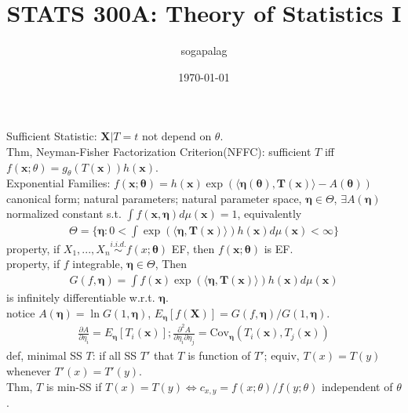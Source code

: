 \documentclass[paper=a4, fontsize=11pt]{scrartcl} %
\title{STATS 300A: Theory of Statistics I}
\author{sogapalag}
\date{\normalsize\today}
\numberwithin{equation}{section} %
\numberwithin{figure}{section} %
\numberwithin{table}{section} %
\def \cov {\text{Cov}}
\begin{document}
\maketitle
Sufficient Statistic: $\mathbf{X}|T=t$ not depend on $\theta$.\\
Thm, Neyman-Fisher Factorization Criterion(NFFC): sufficient $T$ iff $f(\mathbf{x};\theta) = g_\theta(T(\mathbf{x})) h(\mathbf{x})$.\\
Exponential Families: $f(\mathbf{x};\bm{\theta})=h(\mathbf{x})\exp(\langle\bm{\eta}(\bm{\theta}),\mathbf{T}(\mathbf{x})\rangle - A(\bm{\theta}))$\\
canonical form; natural parameters; natural parameter space, $\bm{\eta}\in \Theta$, $\exists A(\bm{\eta})$ normalized constant s.t. $\int f(\mathbf{x},\bm{\eta})d\mu(\mathbf{x})=1$, equivalently
\begin{align}
	\Theta = \{\bm{\eta}: 0<\int \exp(\langle \bm{\eta}, \mathbf{T}(\mathbf{x})\rangle)h(\mathbf{x})d\mu(\mathbf{x}) <\infty\}
\end{align}
property, if $X_1,...,X_n \stackrel{i.i.d.}{\sim} f(x;\bm{\theta})$ EF, then $f(\mathbf{x};\bm{\theta})$ is EF.\\
property, if $f$ integrable, $\bm{\eta}\in\Theta$, Then
\begin{align}
	G(f,\bm{\eta}) = \int f(\mathbf{x}) \exp(\langle \bm{\eta}, \mathbf{T}(\mathbf{x})\rangle)h(\mathbf{x})d\mu(\mathbf{x})
\end{align}
is infinitely differentiable w.r.t. $\bm{\eta}$.\\
notice $ A(\bm{\eta})=\ln G(1,\bm{\eta})$, $E_{\bm{\eta}}[f(\mathbf{X})] = G(f,\bm{\eta})/G(1,\bm{\eta})$.
\begin{align}
	\frac{\partial A}{\partial \eta_i} = E_{\bm{\eta}}[T_i(\mathbf{x})]; \frac{\partial^2 A}{\partial \eta_i \partial \eta_j} = \cov_{\bm{\eta}}(T_i(\mathbf{x}),T_j(\mathbf{x}))
\end{align}
def, minimal SS $T$: if all SS $T'$ that $T$ is  function of $T'$; equiv, $T(x)=T(y)$ whenever $T'(x)=T'(y)$.\\
Thm, $T$ is min-SS if $T(x)=T(y) \Leftrightarrow c_{x,y} = f(x;\theta)/f(y;\theta)$ independent of $\theta$.
\end{document}
